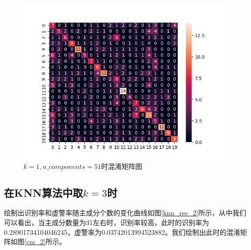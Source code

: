 \documentclass[cn]{elegantbook}
\begin{document}
\begin{figure}[!h]
	\centering
	\includegraphics[width=0.9\linewidth]{../results/cm_1}
	\caption{\label{cm_1}$k=1, n\_components=51$时混淆矩阵图}
\end{figure}

\subsection{在KNN算法中取$k=3$时}
绘制出识别率和虚警率随主成分个数的变化曲线如图\ref{knn_res_2}所示，从中我们可以看出，当主成分数量为31左右时，识别率较高，此时的识别率为0.28901734104046245，虚警率为0.03742013994523882。我们绘制出此时的混淆矩阵如图\ref{cm_2}所示。
\end{document}

